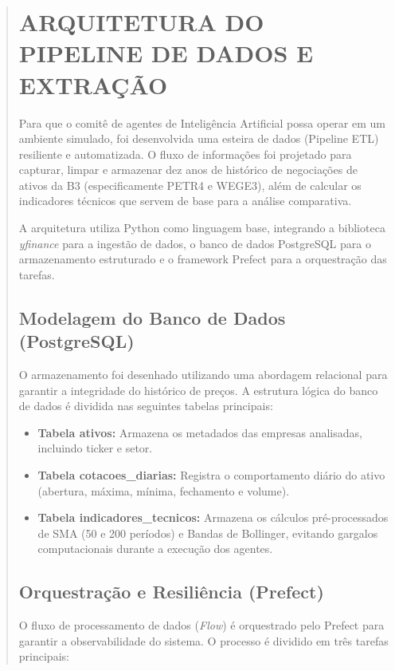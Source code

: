 \documentclass{eic-bcc-tcc}
\begin{document}
\begin{abstract}
\section{ARQUITETURA DO PIPELINE DE DADOS E EXTRAÇÃO}

Para que o comitê de agentes de Inteligência Artificial possa operar em um ambiente simulado, foi desenvolvida uma esteira de dados (Pipeline ETL) resiliente e automatizada. O fluxo de informações foi projetado para capturar, limpar e armazenar dez anos de histórico de negociações de ativos da B3 (especificamente PETR4 e WEGE3), além de calcular os indicadores técnicos que servem de base para a análise comparativa.

A arquitetura utiliza Python como linguagem base, integrando a biblioteca \textit{yfinance} para a ingestão de dados, o banco de dados PostgreSQL para o armazenamento estruturado e o framework Prefect para a orquestração das tarefas.

\subsection{Modelagem do Banco de Dados (PostgreSQL)}

O armazenamento foi desenhado utilizando uma abordagem relacional para garantir a integridade do histórico de preços. A estrutura lógica do banco de dados é dividida nas seguintes tabelas principais:

\begin{itemize}
    \item \textbf{Tabela ativos:} Armazena os metadados das empresas analisadas, incluindo ticker e setor.
    \item \textbf{Tabela cotacoes\_diarias:} Registra o comportamento diário do ativo (abertura, máxima, mínima, fechamento e volume).
    \item \textbf{Tabela indicadores\_tecnicos:} Armazena os cálculos pré-processados de SMA (50 e 200 períodos) e Bandas de Bollinger, evitando gargalos computacionais durante a execução dos agentes.
\end{itemize}

\subsection{Orquestração e Resiliência (Prefect)}

O fluxo de processamento de dados (\textit{Flow}) é orquestrado pelo Prefect para garantir a observabilidade do sistema. O processo é dividido em três tarefas principais:


\end{abstract}
\end{document}
